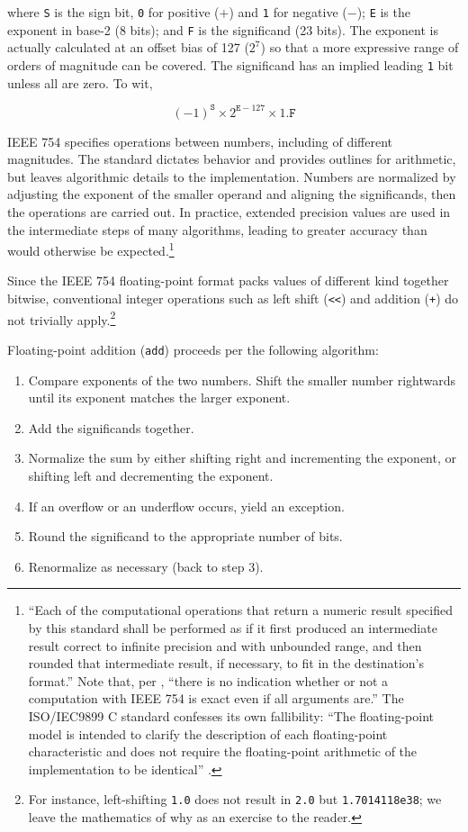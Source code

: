 \documentclass[twoside]{article}
\begin{document}
where \texttt{S} is the sign bit, \texttt{0} for positive ($+$) and \texttt{1} for negative ($-$); \texttt{E} is the exponent in base-2 (8 bits); and \texttt{F} is the significand (23 bits).  The exponent is actually calculated at an offset bias of 127 ($2^{7}$) so that a more expressive range of orders of magnitude can be covered.  The significand has an implied leading \texttt{1} bit unless all are zero.  To wit,

$$
(-1)^{\mathtt{S}} \times 2^{\mathtt{E}-127} \times 1.\mathtt{F}
$$

IEEE 754 specifies operations between numbers, including of different magnitudes.  The standard dictates behavior and provides outlines for arithmetic, but leaves algorithmic details to the implementation.  Numbers are normalized by adjusting the exponent of the smaller operand and aligning the significands, then the operations are carried out.  In practice, extended precision values are used in the intermediate steps of many algorithms, leading to greater accuracy than would otherwise be expected.\footnote{“Each of the computational operations that return a numeric result specified by this standard shall be performed as if it first produced an intermediate result correct to infinite precision and with unbounded range, and then rounded that intermediate result, if necessary, to fit in the destination’s format.”  \citep{IEEE754-2008}  Note that, per \citeauthor{Risse2016}, “there is no indication whether or not a computation with IEEE 754 is exact even if all arguments are.”  The ISO/IEC9899 C standard confesses its own fallibility:  “The floating-point model is intended to clarify the description of each floating-point characteristic and does not require the floating-point arithmetic of the implementation to be identical” \citep[fn.~21]{ISO9899}.}

Since the IEEE 754 floating-point format packs values of different kind together bitwise, conventional integer operations such as left shift (\texttt{<<}) and addition (\texttt{+}) do not trivially apply.\footnote{For instance, left-shifting \texttt{1.0} does not result in \texttt{2.0} but \texttt{1.7014118e38}; we leave the mathematics of why as an exercise to the reader.}

Floating-point addition (\texttt{add}) proceeds per the following algorithm:

\begin{enumerate}
  \item  Compare exponents of the two numbers.  Shift the smaller number rightwards until its exponent matches the larger exponent.
  \item  Add the significands together.
  \item  Normalize the sum by either shifting right and incrementing the exponent, or shifting left and decrementing the exponent.
  \item  If an overflow or an underflow occurs, yield an exception.
  \item  Round the significand to the appropriate number of bits.
  \item  Renormalize as necessary (back to step 3).
\end{enumerate}
\end{document}
